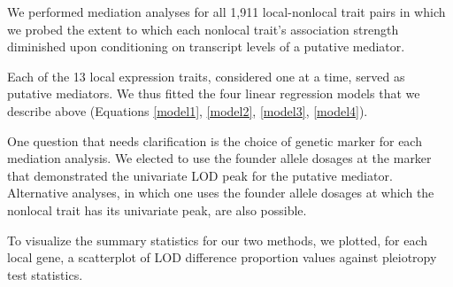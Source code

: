 \documentclass[oneside]{book}\usepackage[]{graphicx}\usepackage[]{color}
\begin{document}
We performed mediation analyses for 
all 1,911 local-nonlocal trait pairs in which
we probed the extent to which each nonlocal trait's association 
strength diminished upon conditioning on transcript levels of a putative mediator.

Each of the 13 local expression traits, considered one at a time, served as putative mediators. 
We thus fitted the four linear regression models that we describe
above (Equations \ref{model1}, \ref{model2}, \ref{model3}, \ref{model4}).

One question that needs clarification is the choice of genetic marker 
for each mediation analysis. 
We elected to use the founder allele dosages at the marker that demonstrated the 
univariate LOD peak for the putative mediator. 
Alternative analyses, in which one uses the founder allele dosages at which the 
nonlocal trait has its univariate peak, are also possible.




To visualize the summary statistics for our two methods, we plotted, 
for each local gene, a scatterplot of LOD difference proportion values 
against pleiotropy test statistics.
\end{document}
